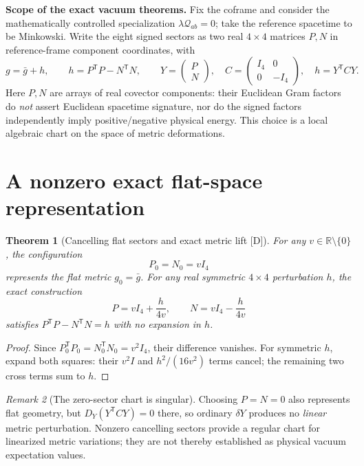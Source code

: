 \documentclass[11pt,a4paper]{article}
\newtheorem{theorem}{Theorem}[section]
\theoremstyle{definition}\newtheorem{definition}[theorem]{Definition}
\theoremstyle{remark}\newtheorem{remark}[theorem]{Remark}
\newcommand{\Dtag}{\textsf{[D]}}
\begin{document}
\textbf{Scope of the exact vacuum theorems.} Fix the coframe and consider the mathematically controlled specialization $\lambda\mathcal Q_{ab}=0$; take the reference spacetime to be Minkowski. Write the eight signed sectors as two real $4\times4$ matrices $P,N$ in reference-frame component coordinates, with
\begin{equation}\label{eq:signed}
 g=\bar g+h,\qquad h=P^{\mathsf T}P-N^{\mathsf T}N,
\qquad Y=\begin{pmatrix}P\\N\end{pmatrix},\quad
 C=\begin{pmatrix}I_4&0\\0&-I_4\end{pmatrix},\quad h=Y^{\mathsf T}CY.
\end{equation}
Here $P,N$ are arrays of real covector components: their Euclidean Gram factors do \emph{not} assert Euclidean spacetime signature, nor do the signed factors independently imply positive/negative physical energy. This choice is a local algebraic chart on the space of metric deformations.

\section{A nonzero exact flat-space representation}
\begin{theorem}[Cancelling flat sectors and exact metric lift \Dtag]\label{thm:flat}
For any $v\in\mathbb R\setminus\{0\}$, the configuration
\begin{equation}\label{eq:vacuum}
\boxed{P_0=N_0=vI_4}
\end{equation}
represents the flat metric $g_0=\bar g$. For any real symmetric $4\times4$ perturbation $h$, the exact construction
\begin{equation}\label{eq:lift}
\boxed{P=vI_4+\frac{h}{4v},\qquad N=vI_4-\frac{h}{4v}}
\end{equation}
satisfies $P^{\mathsf T}P-N^{\mathsf T}N=h$ with no expansion in $h$.
\end{theorem}
\begin{proof} Since $P_0^{\mathsf T}P_0=N_0^{\mathsf T}N_0=v^2I_4$, their difference vanishes. For symmetric $h$, expand both squares: their $v^2I$ and $h^2/(16v^2)$ terms cancel; the remaining two cross terms sum to $h$.\end{proof}

\begin{remark}[The zero-sector chart is singular]
Choosing $P=N=0$ also represents flat geometry, but $D_Y(Y^{\mathsf T}CY)=0$ there, so ordinary $\delta Y$ produces no \emph{linear} metric perturbation. Nonzero cancelling sectors provide a regular chart for linearized metric variations; they are not thereby established as physical vacuum expectation values.
\end{remark}
\end{document}
